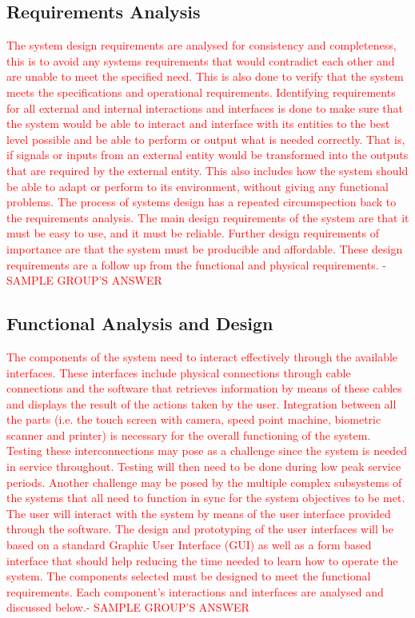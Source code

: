 \documentclass[a4paper,11pt,fleqn]{report}
\begin{document}
\subsection{Requirements Analysis}
\textcolor{red}{The system design requirements are analysed for consistency and completeness, this is to avoid any systems requirements that would contradict each other and are unable to meet the specified need. This is also done to verify that the system meets the specifications and operational requirements. Identifying requirements for all external and internal interactions and interfaces is done to make sure that the system would be able to interact and interface with its entities to the best level possible and be able to perform or output what is needed correctly. That is, if signals or inputs from an external entity would be transformed into the outputs that are required by the external entity. This also includes how the system should be able to adapt or perform to its environment, without giving any functional problems.
The process of systems design has a repeated circumspection back to the requirements analysis. The main design requirements of the system are that it must be easy to use, and it must be reliable. Further design requirements of importance are that the system must be producible and affordable. These design requirements are a follow up from the functional and physical requirements. - SAMPLE GROUP'S ANSWER}

\subsection{Functional Analysis and Design}
\textcolor{red}{The components of the system need to interact effectively through the available interfaces. These interfaces include physical connections through cable connections and the software that retrieves information by means of these cables and displays the result of the actions taken by the user. Integration between all the parts (i.e. the touch screen with camera, speed point machine, biometric scanner and printer) is necessary for the overall functioning of the system. Testing these interconnections may pose as a challenge since the system is needed in service throughout. Testing will then need to be done during low peak service periods. Another challenge may be posed by the multiple complex subsystems of the systems that all need to function in sync for the system objectives to be met. The user will interact with the system by means of the user interface provided through the software. The design and prototyping of the user interfaces will be based on a standard Graphic User Interface (GUI) as well as a form based interface that should help reducing the time needed to learn how to operate the system.
The components selected must be designed to meet the functional requirements. Each component’s interactions and interfaces are analysed and discussed below.- SAMPLE GROUP'S ANSWER}
\end{document}
